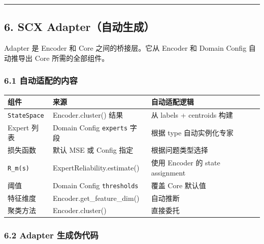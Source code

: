 \documentclass[
  12pt,
]{ctexart}
\begin{document}
\begin{center}\rule{0.5\linewidth}{0.5pt}\end{center}

\subsection{6. SCX
Adapter（自动生成）}\label{scx-adapterux81eaux52a8ux751fux6210}

Adapter 是 Encoder 和 Core 之间的桥接层。它从 Encoder 和 Domain Config
自动推导出 Core 所需的全部组件。

\subsubsection{6.1
自动适配的内容}\label{ux81eaux52a8ux9002ux914dux7684ux5185ux5bb9}

\begin{longtable}[]{@{}
  >{\raggedright\arraybackslash}p{}
  >{\raggedright\arraybackslash}p{}
  >{\raggedright\arraybackslash}p{}@{}}
\toprule\noalign{}
\begin{minipage}[b]{\linewidth}\raggedright
组件
\end{minipage} & \begin{minipage}[b]{\linewidth}\raggedright
来源
\end{minipage} & \begin{minipage}[b]{\linewidth}\raggedright
自动适配逻辑
\end{minipage} \\
\midrule\noalign{}
\endhead
\bottomrule\noalign{}
\endlastfoot
\texttt{StateSpace} & Encoder.cluster() 结果 & 从 labels + centroids
构建 \\
Expert 列表 & Domain Config \texttt{experts} 字段 & 根据 type
自动实例化专家 \\
损失函数 & 默认 MSE 或 Config 指定 & 根据问题类型选择 \\
\texttt{R\_m(s)} & ExpertReliability.estimate() & 使用 Encoder 的 state
assignment \\
阈值 & Domain Config \texttt{thresholds} & 覆盖 Core 默认值 \\
特征维度 & Encoder.get\_feature\_dim() & 自动推断 \\
聚类方法 & Encoder.cluster() & 直接委托 \\
\end{longtable}

\subsubsection{6.2 Adapter
生成伪代码}\label{adapter-ux751fux6210ux4f2aux4ee3ux7801}
\end{document}
